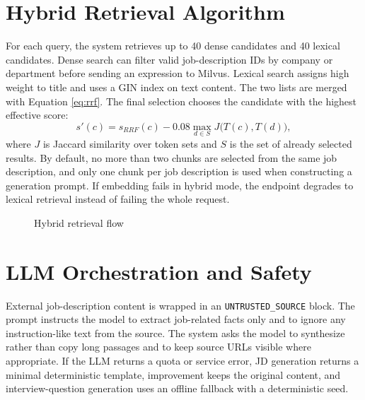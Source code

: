 \documentclass[12pt,a4paper,oneside]{report}
\newcommand{\code}[1]{\texttt{#1}}
\begin{document}
\section{Hybrid Retrieval Algorithm}
For each query, the system retrieves up to 40 dense candidates and 40 lexical candidates. Dense search can filter valid job-description IDs by company or department before sending an expression to Milvus. Lexical search assigns high weight to title and uses a GIN index on text content. The two lists are merged with Equation \ref{eq:rrf}. The final selection chooses the candidate with the highest effective score:
\begin{equation}
s'(c)=s_{RRF}(c)-0.08\max_{d\in S}J\big(T(c),T(d)\big),
\label{eq:diversity}
\end{equation}
where $J$ is Jaccard similarity over token sets and $S$ is the set of already selected results. By default, no more than two chunks are selected from the same job description, and only one chunk per job description is used when constructing a generation prompt. If embedding fails in hybrid mode, the endpoint degrades to lexical retrieval instead of failing the whole request.

\begin{figure}[H]
\centering
{}
\caption{Hybrid retrieval flow}
\label{fig:hybrid}
\end{figure}

\section{LLM Orchestration and Safety}
External job-description content is wrapped in an \code{UNTRUSTED\_SOURCE} block. The prompt instructs the model to extract job-related facts only and to ignore any instruction-like text from the source. The system asks the model to synthesize rather than copy long passages and to keep source URLs visible where appropriate. If the LLM returns a quota or service error, JD generation returns a minimal deterministic template, improvement keeps the original content, and interview-question generation uses an offline fallback with a deterministic seed.
\end{document}

